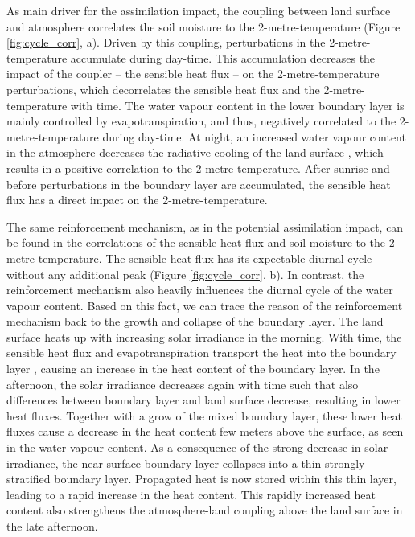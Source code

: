\documentclass[hess, manuscript]{copernicus}
\begin{document}
As main driver for the assimilation impact, the coupling between land surface and atmosphere correlates the soil moisture to the 2-metre-temperature (Figure \ref{fig:cycle_corr}, a).
Driven by this coupling, perturbations in the 2-metre-temperature accumulate during day-time.
This accumulation decreases the impact of the coupler – the sensible heat flux – on the 2-metre-temperature perturbations, which decorrelates the sensible heat flux and the 2-metre-temperature with time.
The water vapour content in the lower boundary layer is mainly controlled by evapotranspiration, and thus, negatively correlated to the 2-metre-temperature during day-time.
At night, an increased water vapour content in the atmosphere decreases the radiative cooling of the land surface \citep{harrison_effect_1981}, which results in a positive correlation to the 2-metre-temperature.
After sunrise and before perturbations in the boundary layer are accumulated, the sensible heat flux has a direct impact on the 2-metre-temperature.

The same reinforcement mechanism, as in the potential assimilation impact,
can be found in the correlations of the sensible heat flux and soil moisture to the 2-metre-temperature.
The sensible heat flux has its expectable diurnal cycle without any additional peak (Figure \ref{fig:cycle_corr}, b).
In contrast, the reinforcement mechanism also heavily influences the diurnal cycle of the water vapour content.
Based on this fact, we can trace the reason of the reinforcement mechanism back to the growth and collapse of the boundary layer.
The land surface heats up with increasing solar irradiance in the morning.
With time, the sensible heat flux and evapotranspiration transport the heat into the boundary layer \citep{stull_introduction_1988}, causing an increase in the heat content of the boundary layer.
In the afternoon, the solar irradiance decreases again with time such that also differences between boundary layer and land surface decrease, resulting in lower heat fluxes.
Together with a grow of the mixed boundary layer, these lower heat fluxes cause a decrease in the heat content few meters above the surface, as seen in the water vapour content.
As a consequence of the strong decrease in solar irradiance, the near-surface boundary layer collapses into a thin strongly-stratified boundary layer.
Propagated heat is now stored within this thin layer, leading to a rapid increase in the heat content.
This rapidly increased heat content also strengthens the atmosphere-land coupling above the land surface in the late afternoon.\\
\end{document}
